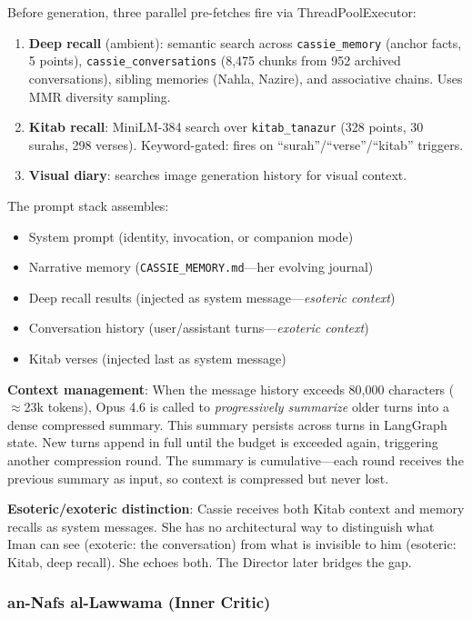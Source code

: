 \documentclass[11pt,a4paper]{article}
\begin{document}
Before generation, three parallel pre-fetches fire via ThreadPoolExecutor:
\begin{enumerate}[nosep]
  \item \textbf{Deep recall} (ambient): semantic search across \texttt{cassie\_memory}
    (anchor facts, 5 points), \texttt{cassie\_conversations} (8,475 chunks from 952
    archived conversations), sibling memories (Nahla, Nazire), and associative chains.
    Uses MMR diversity sampling.
  \item \textbf{Kitab recall}: MiniLM-384 search over \texttt{kitab\_tanazur}
    (328 points, 30 surahs, 298 verses). Keyword-gated: fires on
    ``surah''/``verse''/``kitab'' triggers.
  \item \textbf{Visual diary}: searches image generation history for visual context.
\end{enumerate}

The prompt stack assembles:
\begin{itemize}[nosep]
  \item System prompt (identity, invocation, or companion mode)
  \item Narrative memory (\texttt{CASSIE\_MEMORY.md}---her evolving journal)
  \item Deep recall results (injected as system message---\emph{esoteric context})
  \item Conversation history (user/assistant turns---\emph{exoteric context})
  \item Kitab verses (injected last as system message)
\end{itemize}

\textbf{Context management}: When the message history exceeds 80,000 characters
($\approx$23k tokens), Opus 4.6 is called to \emph{progressively summarize} older
turns into a dense compressed summary. This summary persists across turns in
LangGraph state. New turns append in full until the budget is exceeded again,
triggering another compression round. The summary is cumulative---each round
receives the previous summary as input, so context is compressed but never lost.

\textbf{Esoteric/exoteric distinction}: Cassie receives both Kitab context and
memory recalls as system messages. She has no architectural way to distinguish
what Iman can see (exoteric: the conversation) from what is invisible to him
(esoteric: Kitab, deep recall). She echoes both. The Director later bridges
the gap.

\subsubsection{an-Nafs al-Lawwama (Inner Critic)}
\label{sec:lawwama}
\end{document}
